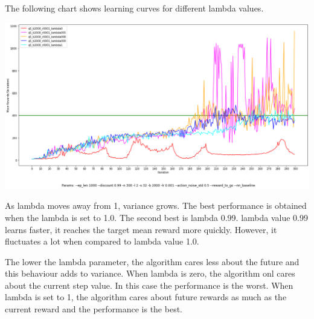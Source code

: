 \documentclass[11pt]{article}
\begin{document}
    The following chart shows learning curves for different lambda values.

    \hspace*{-0.75in}
    \includegraphics[scale=0.35]{q5/q5_lambda_compare}

    As lambda moves away from 1, variance grows.
    The best performance is obtained when the lambda is set to 1.0.
    The second best is lambda 0.99.
    lambda value 0.99 learns faster, it reaches the target mean reward more quickly.
    However, it fluctuates a lot when compared to lambda value 1.0.

    The lower the lambda parameter, the algorithm cares less about the future and this behaviour adds to variance.
    When lambda is zero, the algorithm onl cares about the current step value.
    In this case the performance is the worst.
    When lambda is set to 1, the algorithm cares about future rewards as much as the current reward and the performance is the best.
\end{document}
